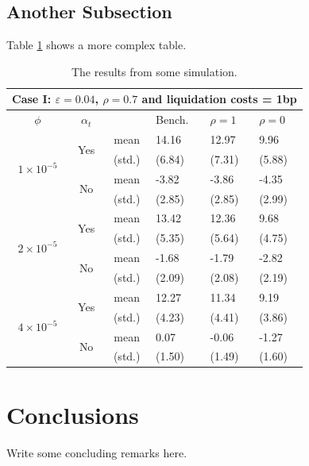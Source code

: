 \documentclass[12pt]{amsart}
\begin{document}
\subsection{Another Subsection}

Table \ref{tbl:SummaryStatistics} shows a more complex table.
\begin{table}[!ht]
\begin{tabular}{ccclll}
 \hline\hline
\multicolumn{6}{c}{Case I: $\varepsilon=0.04$, $\rho=0.7$ and liquidation costs = 1bp} \\
 \hline\hline

$\phi $ & $\alpha_t$ & & Bench.  & $\rho=1$ & $\rho=0$  \\
 \hline  %
 \multicolumn{1}{c}{\multirow{4}[0]{*}{$1\times10^{-5}$}} & \multicolumn{1}{c}{\multirow{2}[0]{*}{Yes}}
  & mean & 14.16 & 12.97 &  9.96 \\[0.5em]
 &  & (std.) &(6.84) & (7.31) & (5.88) \\[0.5em]
& \multicolumn{1}{c}{\multirow{2}[0]{*}{No}}
 & mean & -3.82 & -3.86 & -4.35 \\[0.5em]
&  & (std.) &(2.85) & (2.85) & (2.99) \\[0.5em]

\hline

\multicolumn{1}{c}{\multirow{4}[0]{*}{$2\times10^{-5}$}} & \multicolumn{1}{c}{\multirow{2}[0]{*}{Yes}}
 & mean & 13.42 & 12.36 &  9.68  \\[0.5em]
&  & (std.) &(5.35) & (5.64) & (4.75) \\[0.5em]
& \multicolumn{1}{c}{\multirow{2}[0]{*}{No}}
& mean & -1.68 & -1.79 & -2.82 \\[0.5em]
&  & (std.) &(2.09) & (2.08) & (2.19) \\[0.5em]

\hline

\multicolumn{1}{c}{\multirow{4}[0]{*}{$4\times10^{-5}$}} & \multicolumn{1}{c}{\multirow{2}[0]{*}{Yes}}
 & mean & 12.27 & 11.34 &  9.19 \\[0.5em]
&  & (std.) &(4.23) & (4.41) & (3.86) \\[0.5em]
& \multicolumn{1}{c}{\multirow{2}[0]{*}{No}}
  & mean &  0.07 & -0.06 & -1.27 \\[0.5em]
&  & (std.) &(1.50) & (1.49) & (1.60) \\[0.5em]
 \hline\hline
\end{tabular}
\caption{The results from some simulation. \label{tbl:SummaryStatistics} }
\end{table}

\section{Conclusions}

Write some concluding remarks here.

\clearpage
\end{document}
